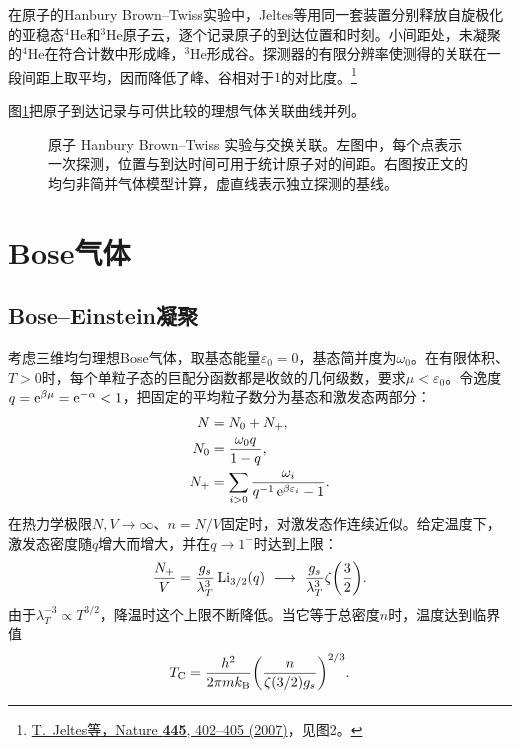 在原子的Hanbury Brown--Twiss实验中，Jeltes等用同一套装置分别释放自旋极化的亚稳态$^4\mathrm{He}$和$^3\mathrm{He}$原子云，逐个记录原子的到达位置和时刻。小间距处，未凝聚的$^4\mathrm{He}$在符合计数中形成峰，$^3\mathrm{He}$形成谷。探测器的有限分辨率使测得的关联在一段间距上取平均，因而降低了峰、谷相对于$1$的对比度。\footnote{\href{https://doi.org/10.1038/nature05513}{T.~Jeltes等，Nature \textbf{445}, 402--405 (2007)}，见图2。}

图\ref{fig:atomic-hbt}把原子到达记录与可供比较的理想气体关联曲线并列。
\begin{figure}[htbp]
    \centering{}
    \caption{原子 Hanbury Brown--Twiss 实验与交换关联。左图中，每个点表示一次探测，位置与到达时间可用于统计原子对的间距。右图按正文的均匀非简并气体模型计算，虚直线表示独立探测的基线。}
    \label{fig:atomic-hbt}
\end{figure}

\section{Bose气体}

\subsection{Bose--Einstein凝聚}

考虑三维均匀理想Bose气体，取基态能量$\varepsilon_0 = 0$，基态简并度为$\omega_0$。在有限体积、$T > 0$时，每个单粒子态的巨配分函数都是收敛的几何级数，要求$\mu < \varepsilon_0$。令逸度$q = \mathop{}\!\mathrm{e}^{\beta\mu} = \mathop{}\!\mathrm{e}^{-\alpha} < 1$，把固定的平均粒子数分为基态和激发态两部分：
\begin{subequations}
	\label{eq:sm-bose-populations}
	\begin{align}
		N &= N_0 + N_+,\\
		N_0 &= \frac{\omega_0 q}{1 - q},\\
		N_+ &= \sum_{i>0}\frac{\omega_i}{q^{-1}\mathop{}\!\mathrm{e}^{\beta\varepsilon_i} - 1}.
	\end{align}
\end{subequations}
在热力学极限$N,V \to \infty$、$n = N/V$固定时，对激发态作连续近似。给定温度下，激发态密度随$q$增大而增大，并在$q \to 1^-$时达到上限：
\begin{equation}
	\label{eq:sm-bose-excited-density-bound}
	\frac{N_+}{V} = \frac{g_s}{\lambda_T^3}\Li_{3/2}(q)
	\  \longrightarrow \ \frac{g_s}{\lambda_T^3}\zeta\biggp{\frac32}.
\end{equation}
由于$\lambda_T^{-3} \propto T^{3/2}$，降温时这个上限不断降低。当它等于总密度$n$时，温度达到临界值
\begin{equation}
	\label{eqn:Bose TC}
	T_\mathrm C = \frac{h^2}{2\pi mk_{\mathrm{B}}}\biggl(\frac n{\zeta(3/2)g_s}\biggr)^{2/3}.
\end{equation}

